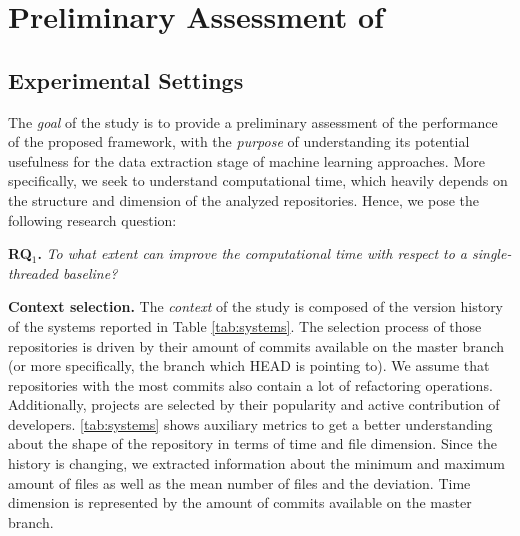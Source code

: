 
\section{Preliminary Assessment of \iris}
\label{sec:assessment}

\subsection{Experimental Settings}
\label{sec:method}
The \emph{goal} of the study is to provide a preliminary assessment of the performance of the proposed framework, with the \emph{purpose} of understanding its potential usefulness for the data extraction stage of machine learning approaches. More specifically, we seek to understand computational time, which heavily depends on the structure and dimension of the analyzed repositories. Hence, we pose the following research question:

\begin{center}
	\begin{examplebox}
		\textbf{RQ$_1$.} \emph{To what extent can \iris improve the computational time with respect to a single-threaded baseline?}	
	\end{examplebox}
\end{center}

\textbf{Context selection.} The \emph{context} of the study is composed of the version history of the systems reported in Table \ref{tab:systems}. The selection process of those repositories is driven by their amount of commits available on the master branch (or more specifically, the branch which HEAD is pointing to). We assume that repositories with the most commits also contain a lot of refactoring operations. Additionally, projects are selected by their popularity and active contribution of developers. \ref{tab:systems} shows auxiliary metrics to get a better understanding about the shape of the repository in terms of time and file dimension. Since the history is changing, we extracted information about the minimum and maximum amount of files as well as the mean number of files and the deviation. Time dimension is represented by the amount of commits available on the master branch.

